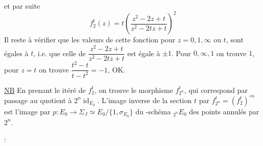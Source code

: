 et par suite
\[
\tag{37}f_2^t(z)=t\left(\frac{z^2-2z+t}{z^2-2tz+t}\right)^2
\]
Il reste à vérifier que les valeurs de cette fonction pour $z=0,1,\infty$ ou $t$, sont égales à $t$, i.e. que celle de $\dfrac{z^2-2z+t}{z^2-2tz+t}$ est égale à $\pm1$. Pour $0,\infty,1$ on trouve $1$, pour $z=t$ on trouve $\dfrac{t^2-t}{t-t^2}=-1$, OK.

\uline{NB} En prenant le  itéré de $f_2^t$, on trouve le morphisme $f_{2^n}^t$, qui correspond par passage au quotient à $2^n\operatorname{id}_{E_0}$. L'image inverse de la section $t$ par $f_{2^n}^t=(f_2^t)^{\circ n}$ est l'image par $p:E_0\longrightarrow\Sigma_J\simeq E_0/\{1,\sigma_{E_0}\}$ du  -schéma  ${}_{2^n}E_0$ des points annulés par $2^n$.

:
